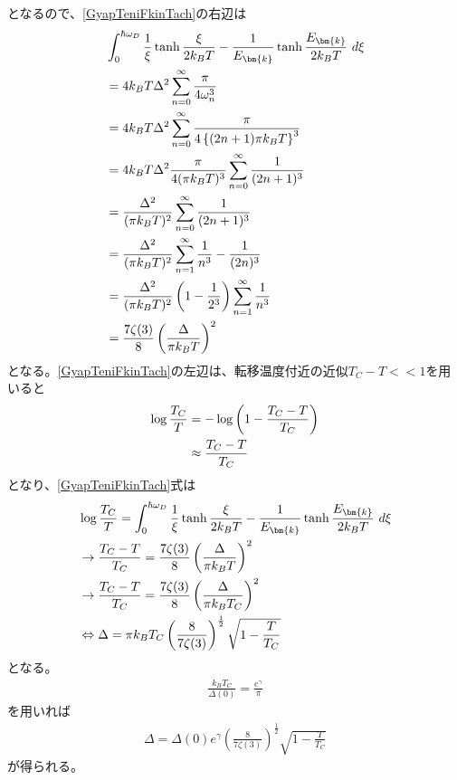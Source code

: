\documentclass[dvipdfmx, 11pt, a4paper]{jsarticle}
\numberwithin{equation}{section}
\theoremstyle{definition}
\begin{document}
\begin{derivationBox}
        となるので、\eqref{GyapTeniFkinTach}の右辺は
        \begin{align}
            &\int_{0}^{\hbar \omega_D}   \frac{1}{\xi} \tanh \frac{ \xi}{2k_B T} -   \frac{1}{E_{\bm{k}}} \tanh \frac{ E_{\bm{k}}}{2k_B T}\  d\xi \notag \\
            &= 4k_BT\Delta^2\sum_{n=0}^\infty \frac{\pi}{4\omega_n^3} \notag \\
            &= 4k_BT\Delta^2\sum_{n=0}^\infty \frac{\pi}{4\left\{ (2n+1)\pi k_BT  \right\}^3} \notag \\
            &= 4k_BT\Delta^2 \frac{\pi}{4(\pi k_BT )^3}\sum_{n=0}^\infty \frac{1}{(2n+1)^3} \notag \\
            &=\frac{\Delta^2}{(\pi k_BT)^2}\sum_{n=0}^\infty \frac{1}{(2n+1)^3} \notag \\
            &= \frac{\Delta^2}{(\pi k_BT)^2}\sum_{n=1}^\infty \frac{1}{n^3} - \frac{1}{(2n)^3} \notag \\
            &= \frac{\Delta^2}{(\pi k_BT)^2}\left( 1 - \frac{1}{2^3} \right)\sum_{n=1}^\infty \frac{1}{n^3} \notag \\
            &= \frac{7\zeta(3)}{8} \left( \frac{\Delta}{\pi k_B T} \right)^2
        \end{align}
        となる。\eqref{GyapTeniFkinTach}の左辺は、転移温度付近の近似$T_C-T<<1$を用いると
        \begin{align}
            \log \frac{T_C}{T} &= -\log \left( 1 - \frac{T_C-T}{T_C}\right) \notag \\
            &\approx \frac{T_C-T}{T_C}
        \end{align}
        となり、\eqref{GyapTeniFkinTach}式は
        \begin{align}
            &\log \frac{T_C}{T} = \int_{0}^{\hbar \omega_D}   \frac{1}{\xi} \tanh \frac{ \xi}{2k_B T} -   \frac{1}{E_{\bm{k}}} \tanh \frac{ E_{\bm{k}}}{2k_B T}\  d\xi \notag \\
            &\rightarrow \frac{T_C-T}{T_C} = \frac{7\zeta(3)}{8} \left( \frac{\Delta}{\pi k_B T} \right)^2 \notag \\
            &\rightarrow \frac{T_C-T}{T_C} = \frac{7\zeta(3)}{8} \left( \frac{\Delta}{\pi k_B T_C} \right)^2 \notag \\
            &\Leftrightarrow \Delta =  \pi k_BT_C \left( \frac{8}{7\zeta(3)}  \right)^{\frac{1}{2}} \sqrt{1- \frac{T}{T_C}}
        \end{align}
        となる。
        \begin{align}
            \frac{k_B T_C}{\Delta(0)} = \frac{e^{\gamma}}{\pi}
        \end{align}
        を用いれば
        \begin{align}
            \Delta =  \Delta(0) e^\gamma \left( \frac{8}{7\zeta(3)}  \right)^{\frac{1}{2}} \sqrt{1- \frac{T}{T_C}}
        \end{align}
        が得られる。
    \end{derivationBox}
\end{document}
